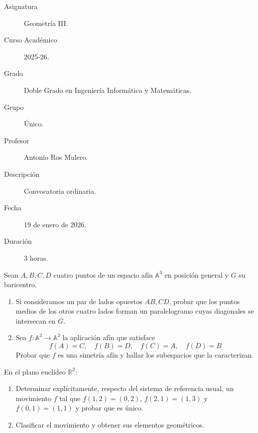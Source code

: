 \documentclass[12pt]{article}
\begin{document}

    
    

    \begin{description}
        \item[Asignatura] Geometría III.
        \item[Curso Académico] 2025-26.
        \item[Grado] Doble Grado en Ingeniería Informática y Matemáticas.
        \item[Grupo] Único.
        \item[Profesor] Antonio Ros Mulero.
        \item[Descripción] Convocatoria ordinaria.
        \item[Fecha] 19 de enero de 2026.
        \item[Duración] 3 horas.
    \end{description}
    \newpage
    
    \begin{ejercicio}[2,5 puntos] Sean $A, B, C, D$ cuatro puntos de un espacio afín $\mathbb{A}^{3}$ en posición general y $G$ su baricentro.
        \begin{enumerate}
            \item Si consideramos un par de lados opuestos $AB, CD$, probar que los puntos medios de los otros cuatro lados forman un paralelogramo cuyas diagonales se intersecan en $G$.
            \item Sea $f:\mathbb{A}^{3}\rightarrow\mathbb{A}^{3}$ la aplicación afín que satisface
            \[
            f(A)=C, \quad f(B)=D, \quad f(C)=A, \quad f(D)=B
            \]
            Probar que $f$ es una simetría afín y hallar los subespacios que la caracterizan.
        \end{enumerate}
    \end{ejercicio}


    \begin{ejercicio}[2,5 puntos] En el plano euclídeo $\mathbb{R}^{2}$:
        \begin{enumerate}
            \item Determinar explícitamente, respecto del sistema de referencia usual, un movimiento $f$ tal que $f(1,2)=(0,2)$, $f(2,1)=(1,3)$ y $f(0,1)=(1,1)$ y probar que es único.
            \item Clasificar el movimiento y obtener sus elementos geométricos.
        \end{enumerate}
    \end{ejercicio}
\end{document}
